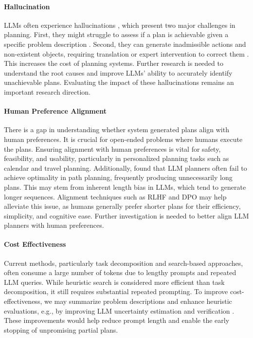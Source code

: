 \vspace{-0.08in}
\paragraph{Hallucination}  LLMs often experience hallucinations \cite{huang2023survey}, which present two major challenges in planning. First, they might struggle to assess if a plan is achievable given a specific problem description \cite{aghzal2023can, kambhampati2024can}. Second, they can generate inadmissible actions and non-existent objects, requiring translation or expert intervention to correct them \cite{huang2022language, raman2022planning}. This increases the cost of planning systems. Further research is needed to understand the root causes and improve LLMs' ability to accurately identify unachievable plans. Evaluating the impact of these hallucinations remains an important research direction.

\vspace{-0.08in}
\paragraph{Human Preference Alignment}\; There is a gap in understanding whether system generated plans align with human preferences. It is crucial for open-ended problems where humans execute the plans. Ensuring alignment with human preferences is vital for safety, feasibility, and usability, particularly in personalized planning tasks such as calendar and travel planning. Additionally, \citet{aghzal2024look} found that LLM planners often fail to achieve optimality in path planning, frequently producing unnecessarily long plans. This may stem from inherent length bias in LLMs, which tend to generate longer sequences. Alignment techniques such as RLHF \cite{ouyang2022training} and DPO \cite{rafailov2024direct} may help alleviate this issue, as humans generally prefer shorter plans for their efficiency, simplicity, and cognitive ease. Further investigation is needed to better align LLM planners with human preferences.

\vspace{-0.07in}
\paragraph{Cost Effectiveness} Current methods, particularly task decomposition and search-based approaches, often consume a large number of tokens due to lengthy prompts and repeated LLM queries. While heuristic search is considered more efficient than task decomposition, it still requires substantial repeated prompting. To improve cost-effectiveness, we may summarize problem descriptions and enhance heuristic evaluations, e.g., by improving LLM uncertainty estimation \cite{huang2024survey} and verification \cite{li2024systematicanalysisllmcontributions}. These improvements would help reduce prompt length and enable the early stopping of unpromising partial plans.

